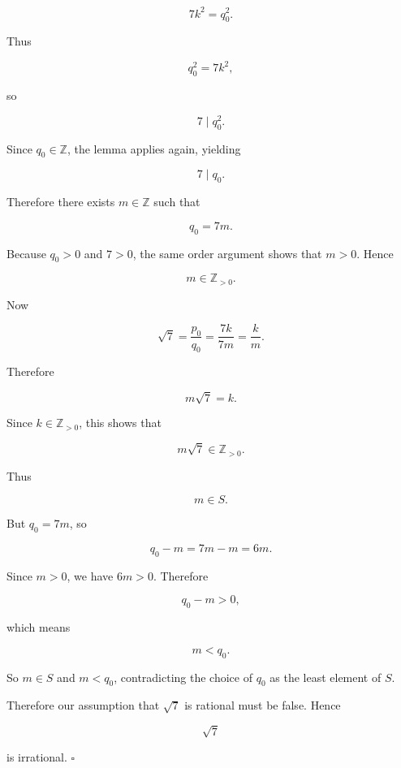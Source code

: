 \[
7k^2=q_0^2.
\]

Thus

\[
q_0^2=7k^2,
\]

so

\[
7\mid q_0^2.
\]

Since \(q_0\in\mathbb Z\), the lemma applies again, yielding

\[
7\mid q_0.
\]

Therefore there exists \(m\in\mathbb Z\) such that

\[
q_0=7m.
\]

Because \(q_0>0\) and \(7>0\), the same order argument shows that \(m>0\). Hence

\[
m\in\mathbb Z_{>0}.
\]

Now

\[
\sqrt 7=\frac{p_0}{q_0}
=\frac{7k}{7m}
=\frac{k}{m}.
\]

Therefore

\[
m\sqrt 7=k.
\]

Since \(k\in\mathbb Z_{>0}\), this shows that

\[
m\sqrt 7\in\mathbb Z_{>0}.
\]

Thus

\[
m\in S.
\]

But \(q_0=7m\), so

\[
q_0-m=7m-m=6m.
\]

Since \(m>0\), we have \(6m>0\). Therefore

\[
q_0-m>0,
\]

which means

\[
m<q_0.
\]

So \(m\in S\) and \(m<q_0\), contradicting the choice of \(q_0\) as the least element of \(S\).

Therefore our assumption that \(\sqrt 7\) is rational must be false. Hence

\[
\sqrt 7
\]

is irrational. \(\square\)